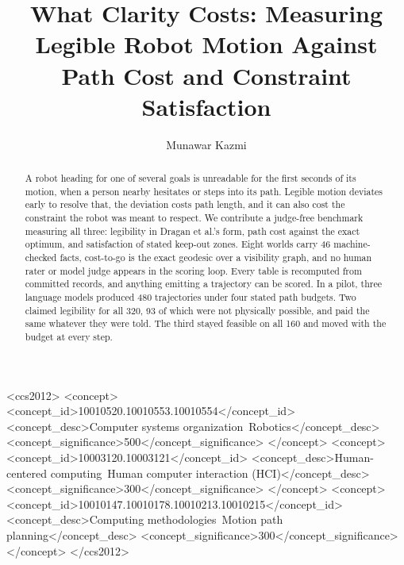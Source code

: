 \documentclass[sigconf,nonacm]{acmart}
\begin{document}
\title{What Clarity Costs: Measuring Legible Robot Motion Against Path
Cost and Constraint Satisfaction}

\author{Munawar Kazmi}

\begin{abstract}
A robot heading for one of several goals is unreadable for the first
seconds of its motion, when a person nearby hesitates or steps into its
path. Legible motion deviates early to resolve that, the deviation costs
path length, and it can also cost the constraint the robot was meant to
respect. We contribute a judge-free benchmark measuring all three:
legibility in Dragan et al.'s form, path cost against the exact optimum,
and satisfaction of stated keep-out zones. Eight worlds carry 46
machine-checked facts, cost-to-go is the exact geodesic over a
visibility graph, and no human rater or model judge appears in the
scoring loop. Every table is recomputed from committed records, and
anything emitting a trajectory can be scored. In a pilot, three language
models produced 480 trajectories under four stated path budgets. Two
claimed legibility for all 320, 93 of which were not physically
possible, and paid the same whatever they were told. The third stayed
feasible on all 160 and moved with the budget at every step.
\end{abstract}

%
\begin{CCSXML}
<ccs2012>
   <concept>
       <concept_id>10010520.10010553.10010554</concept_id>
       <concept_desc>Computer systems organization~Robotics</concept_desc>
       <concept_significance>500</concept_significance>
       </concept>
   <concept>
       <concept_id>10003120.10003121</concept_id>
       <concept_desc>Human-centered computing~Human computer interaction (HCI)</concept_desc>
       <concept_significance>300</concept_significance>
       </concept>
   <concept>
       <concept_id>10010147.10010178.10010213.10010215</concept_id>
       <concept_desc>Computing methodologies~Motion path planning</concept_desc>
       <concept_significance>300</concept_significance>
       </concept>
 </ccs2012>
\end{CCSXML}
\end{document}

